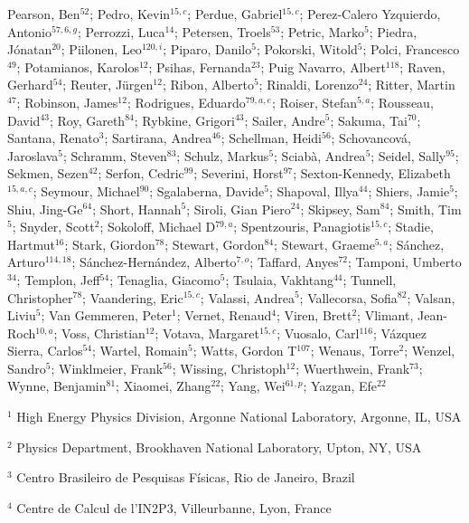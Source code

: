 Pearson, Ben$^{52}$;
Pedro, Kevin$^{15,c}$;
Perdue, Gabriel$^{15,c}$;
Perez-Calero Yzquierdo, Antonio$^{57,6,g}$;
Perrozzi, Luca$^{14}$;
Petersen, Troels$^{53}$;
Petric, Marko$^{5}$;
Piedra, Jónatan$^{20}$;
Piilonen, Leo$^{120,i}$;
Piparo, Danilo$^{5}$;
Pokorski, Witold$^{5}$;
Polci, Francesco$^{49}$;
Potamianos, Karolos$^{12}$;
Psihas, Fernanda$^{23}$;
Puig Navarro, Albert$^{118}$;
Raven, Gerhard$^{54}$;
Reuter, Jürgen$^{12}$;
Ribon, Alberto$^{5}$;
Rinaldi, Lorenzo$^{24}$;
Ritter, Martin$^{47}$;
Robinson, James$^{12}$;
Rodrigues, Eduardo$^{79,a,e}$;
Roiser, Stefan$^{5,a}$;
Rousseau, David$^{43}$;
Roy, Gareth$^{84}$;
Rybkine, Grigori$^{43}$;
Sailer, Andre$^{5}$;
Sakuma, Tai$^{70}$;
Santana, Renato$^{3}$;
Sartirana, Andrea$^{46}$;
Schellman, Heidi$^{56}$;
Schovancová, Jaroslava$^{5}$;
Schramm, Steven$^{83}$;
Schulz, Markus$^{5}$;
Sciabà, Andrea$^{5}$;
Seidel, Sally$^{95}$;
Sekmen, Sezen$^{42}$;
Serfon, Cedric$^{99}$;
Severini, Horst$^{97}$;
Sexton-Kennedy, Elizabeth$^{15,a,c}$;
Seymour, Michael$^{90}$;
Sgalaberna, Davide$^{5}$;
Shapoval, Illya$^{44}$;
Shiers, Jamie$^{5}$;
Shiu, Jing-Ge$^{64}$;
Short, Hannah$^{5}$;
Siroli, Gian Piero$^{24}$;
Skipsey, Sam$^{84}$;
Smith, Tim$^{5}$;
Snyder, Scott$^{2}$;
Sokoloff, Michael D$^{79,a}$;
Spentzouris, Panagiotis$^{15,c}$;
Stadie, Hartmut$^{16}$;
Stark, Giordon$^{78}$;
Stewart, Gordon$^{84}$;
Stewart, Graeme$^{5,a}$;
Sánchez, Arturo$^{114,18}$;
Sánchez-Hernández, Alberto$^{7,o}$;
Taffard, Anyes$^{72}$;
Tamponi, Umberto$^{34}$;
Templon, Jeff$^{54}$;
Tenaglia, Giacomo$^{5}$;
Tsulaia, Vakhtang$^{44}$;
Tunnell, Christopher$^{78}$;
Vaandering, Eric$^{15,c}$;
Valassi, Andrea$^{5}$;
Vallecorsa, Sofia$^{82}$;
Valsan, Liviu$^{5}$;
Van Gemmeren, Peter$^{1}$;
Vernet, Renaud$^{4}$;
Viren, Brett$^{2}$;
Vlimant, Jean-Roch$^{10,a}$;
Voss, Christian$^{12}$;
Votava, Margaret$^{15,c}$;
Vuosalo, Carl$^{116}$;
Vázquez Sierra, Carlos$^{54}$;
Wartel, Romain$^{5}$;
Watts, Gordon T$^{107}$;
Wenaus, Torre$^{2}$;
Wenzel, Sandro$^{5}$;
Winklmeier, Frank$^{56}$;
Wissing, Christoph$^{12}$;
Wuerthwein, Frank$^{73}$;
Wynne, Benjamin$^{81}$;
Xiaomei, Zhang$^{22}$;
Yang, Wei$^{61,p}$;
Yazgan, Efe$^{22}$
\bigskip
\par {\footnotesize $^{1}$ High Energy Physics Division, Argonne National Laboratory, Argonne, IL, USA}
\par {\footnotesize $^{2}$ Physics Department, Brookhaven National Laboratory, Upton, NY, USA}
\par {\footnotesize $^{3}$ Centro Brasileiro de Pesquisas Físicas, Rio de Janeiro, Brazil}
\par {\footnotesize $^{4}$ Centre de Calcul de l’IN2P3, Villeurbanne, Lyon, France}
